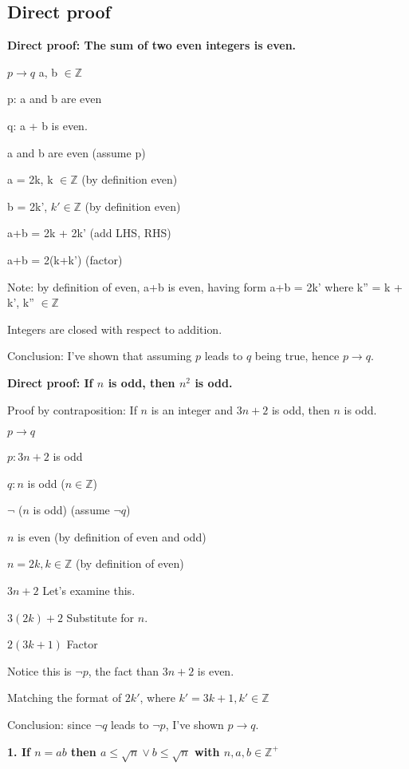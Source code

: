 \documentclass[english,openany]{book}
\begin{document}
	\subsection{Direct proof}

	\textbf{Direct proof: The sum of two even integers is even.}

	$p \rightarrow q$
	a, b $\in {\mathbb Z}$

	p: a and b are even

	q: a + b is even.

	a and b are even (assume p)

	a = 2k, k $\in {\mathbb Z}$ (by definition even)

	b = 2k', $k' \in {\mathbb Z}$ (by definition even)

	a+b = 2k + 2k' (add LHS, RHS)

	a+b = 2(k+k') (factor)

	Note: by definition of even, a+b is even, having form a+b = 2k' where k'' = k + k', k'' $\in {\mathbb Z}$

	Integers are closed with respect to addition.

	Conclusion: I've shown that assuming $p$ leads to $q$ being true, hence $p \rightarrow q$.\newline

	\textbf{Direct proof: If $n$ is odd, then $n^2$ is odd.}

	Proof by contraposition: If $n$ is an integer and $3n+2$ is odd, then $n$ is odd.

	$p \rightarrow q$

	$p: 3n+2$ is odd

	$q: n$ is odd ($n \in {\mathbb Z}$)

	$\neg$ ($n$ is odd) (assume $\neg q$)

	$n$ is even (by definition of even and odd)

	$n = 2k, k \in {\mathbb Z}$ (by definition of even)

	$3n+2$ Let's examine this.

	$3(2k) + 2$ Substitute for $n$.

	$2(3k+1)$ Factor

	Notice this is $\neg p$, the fact than $3n+2$ is even.

	Matching the format of $2k'$, where $k' = 3k+1, k' \in \mathbb Z$

	Conclusion: since $\neg q$ leads to $\neg p$, I've shown $p \rightarrow q$.

		\textbf{1. If $n = ab$ then $a \leq \sqrt{n} \lor b \leq \sqrt{n}$ with $n, a, b \in \mathbb Z^+$}
\end{document}

